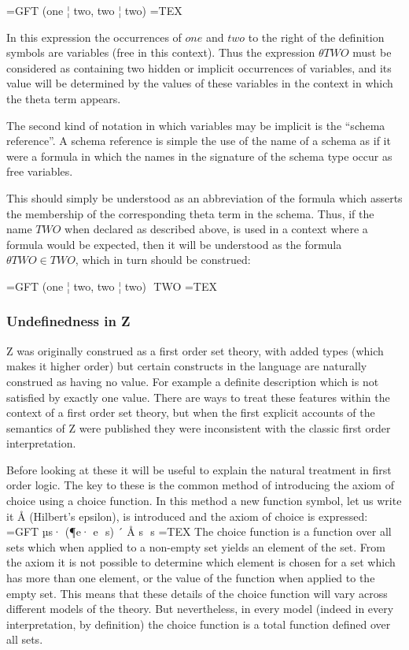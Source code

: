 \documentclass[10pt,titlepage]{book}
\begin{document}
=GFT
	(one ¦ two, two ¦ two)
=TEX

In this expression the occurrences of $one$ and $two$ to the right of the definition symbols are variables (free in this context).
Thus the expression ${\theta}TWO$ must be considered as containing two hidden or implicit occurrences of variables, and its value will be determined by the values of these variables in the context in which the theta term appears.

The second kind of notation in which variables may be implicit is the ``schema reference''.
A schema reference is simple the use of the name of a schema as if it were a formula in which the names in the signature of the schema type occur as free variables.

This should simply be understood as an abbreviation of the formula which asserts the membership of the corresponding theta term in the schema.
Thus, if the name $TWO$ when declared as described above, is used in a context where a formula would be expected, then it will be understood as the formula ${\theta}TWO \in TWO$, which in turn should be construed:

=GFT
	(one ¦ two, two ¦ two)  TWO
=TEX

\subsubsection{Undefinedness in Z}

Z was originally construed as a first order set theory, with added types (which makes it higher order) but certain constructs in the language are naturally construed as having no value.
For example a definite description which is not satisfied by exactly one value.
There are ways to treat these features within the context of a first order set theory, but when the first explicit accounts of the semantics of Z were published they were inconsistent with the classic first order interpretation.

Before looking at these it will be useful to explain the natural treatment in first order logic.
The key to these is the common method of introducing the axiom of choice using a choice function.
In this method a new function symbol, let us write it $Å$ (Hilbert's epsilon), is introduced and the axiom of choice is expressed:
=GFT
	µs· (¶e· e  s) ´ Å s  s	
=TEX
The choice function is a function over all sets which when applied to a non-empty set yields an element of the set.
From the axiom it is not possible to determine which element is chosen for a set which has more than one element, or the value of the function when applied to the empty set.
This means that these details of the choice function will vary across different models of the theory.
But nevertheless, in every model (indeed in every interpretation, by definition) the choice function is a total function defined over all sets.
\end{document}
